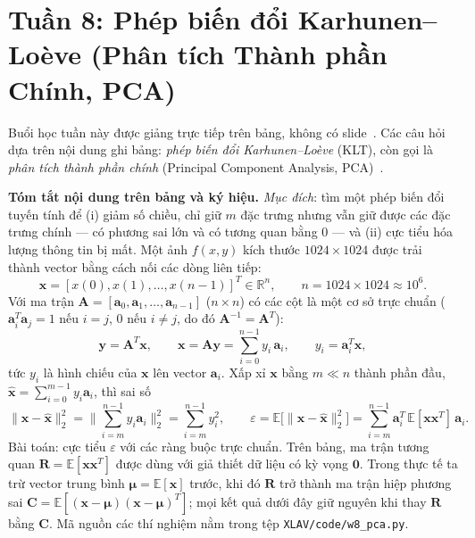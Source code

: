 \section{Tuần 8: Phép biến đổi Karhunen--Loève (Phân tích Thành phần Chính, PCA)}
\label{sec:week8}

Buổi học tuần này được giảng trực tiếp trên bảng, không có slide~\citep{xlav_lec8}. Các câu hỏi dựa trên nội dung ghi bảng: \emph{phép biến đổi Karhunen--Loève} (KLT), còn gọi là \emph{phân tích thành phần chính} (Principal Component Analysis, PCA)~\citep{jolliffe2002principal}.

\textbf{Tóm tắt nội dung trên bảng và ký hiệu.} \emph{Mục đích}: tìm một phép biến đổi tuyến tính để (i) giảm số chiều, chỉ giữ $m$ đặc trưng nhưng vẫn giữ được các đặc trưng chính — có phương sai lớn và có tương quan bằng $0$ — và (ii) cực tiểu hóa lượng thông tin bị mất. Một ảnh $f(x, y)$ kích thước $1024 \times 1024$ được trải thành vector bằng cách nối các dòng liên tiếp:
\begin{equation}
\mathbf{x} = [x(0), x(1), \ldots, x(n - 1)]^T \in \mathbb{R}^n, \qquad n = 1024 \times 1024 \approx 10^6.
\end{equation}
Với ma trận $\mathbf{A} = [\mathbf{a}_0, \mathbf{a}_1, \ldots, \mathbf{a}_{n-1}]$ ($n \times n$) có các cột là một cơ sở trực chuẩn ($\mathbf{a}_i^T\mathbf{a}_j = 1$ nếu $i = j$, $0$ nếu $i \ne j$, do đó $\mathbf{A}^{-1} = \mathbf{A}^T$):
\begin{equation}
\mathbf{y} = \mathbf{A}^T\mathbf{x}, \qquad \mathbf{x} = \mathbf{A}\mathbf{y} = \sum_{i=0}^{n-1} y_i\,\mathbf{a}_i, \qquad y_i = \mathbf{a}_i^T\mathbf{x},
\end{equation}
tức $y_i$ là hình chiếu của $\mathbf{x}$ lên vector $\mathbf{a}_i$. Xấp xỉ $\mathbf{x}$ bằng $m \ll n$ thành phần đầu, $\hat{\mathbf{x}} = \sum_{i=0}^{m-1} y_i\mathbf{a}_i$, thì sai số
\begin{equation}
\|\mathbf{x} - \hat{\mathbf{x}}\|_2^2 = \Big\|\sum_{i=m}^{n-1} y_i\mathbf{a}_i\Big\|_2^2 = \sum_{i=m}^{n-1} y_i^2, \qquad
\varepsilon = \mathbb{E}\big[\|\mathbf{x} - \hat{\mathbf{x}}\|_2^2\big] = \sum_{i=m}^{n-1}\mathbf{a}_i^T\,\mathbb{E}[\mathbf{x}\mathbf{x}^T]\,\mathbf{a}_i.
\label{eq:w8_error}
\end{equation}
Bài toán: cực tiểu $\varepsilon$ với các ràng buộc trực chuẩn. Trên bảng, ma trận tương quan $\mathbf{R} = \mathbb{E}[\mathbf{x}\mathbf{x}^T]$ được dùng với giả thiết dữ liệu có kỳ vọng $\mathbf{0}$. Trong thực tế ta trừ vector trung bình $\boldsymbol{\mu} = \mathbb{E}[\mathbf{x}]$ trước, khi đó $\mathbf{R}$ trở thành ma trận hiệp phương sai $\mathbf{C} = \mathbb{E}[(\mathbf{x} - \boldsymbol{\mu})(\mathbf{x} - \boldsymbol{\mu})^T]$; mọi kết quả dưới đây giữ nguyên khi thay $\mathbf{R}$ bằng $\mathbf{C}$. Mã nguồn các thí nghiệm nằm trong tệp \texttt{XLAV/code/w8\_pca.py}.

